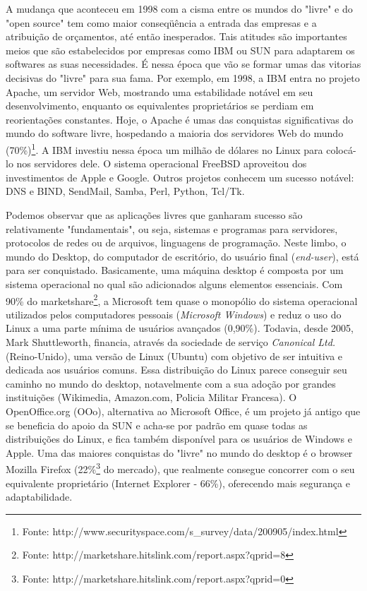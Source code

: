 A mudança que aconteceu em 1998 com a cisma entre os mundos do "livre" e do "open source" tem como maior conseqüência a entrada das empresas e a atribuição de orçamentos, até então inesperados. Tais atitudes são importantes meios que são estabelecidos por empresas como IBM ou SUN para adaptarem os softwares as suas necessidades. É nessa época que vão se formar umas das vitorias decisivas do "livre" para sua fama. Por exemplo, em 1998, a IBM entra no projeto Apache, um servidor Web, mostrando uma estabilidade notável em seu desenvolvimento, enquanto os equivalentes proprietários se perdiam em reorientações constantes. Hoje, o Apache é umas das conquistas significativas do mundo do software livre, hospedando a maioria dos servidores Web do mundo (70\%)\footnote{Fonte: http://www.securityspace.com/s\_survey/data/200905/index.html}. A IBM investiu nessa época um milhão de dólares no Linux para colocá-lo nos servidores dele. O sistema operacional FreeBSD aproveitou dos investimentos de Apple e Google. Outros projetos conhecem um sucesso notável: DNS e BIND, SendMail, Samba, Perl, Python, Tcl/Tk.

Podemos observar que as aplicações livres que ganharam sucesso são relativamente "fundamentais", ou seja, sistemas e programas para servidores, protocolos de redes ou de arquivos, linguagens de programação. Neste limbo, o mundo do Desktop, do computador de escritório, do usuário final (\emph{end-user}), está para ser conquistado. Basicamente, uma máquina desktop é composta por um sistema operacional no qual são adicionados alguns elementos essenciais. Com 90\% do marketshare\footnote{Fonte: http://marketshare.hitslink.com/report.aspx?qprid=8}, a Microsoft tem quase o monopólio do sistema operacional utilizados pelos computadores pessoais (\emph{Microsoft Windows}) e reduz o uso do Linux a uma parte mínima de usuários avançados (0,90\%).  Todavia, desde 2005, Mark Shuttleworth, financia, através da sociedade de serviço \emph{Canonical Ltd.} (Reino-Unido), uma versão de Linux (Ubuntu) com objetivo de ser intuitiva e dedicada aos usuários comuns. Essa distribuição do Linux parece conseguir seu caminho no mundo do desktop, notavelmente com a sua adoção por grandes instituições (Wikimedia, Amazon.com, Policia Militar Francesa). O OpenOffice.org (OOo), alternativa ao Microsoft Office, é um projeto já antigo que se beneficia do apoio da SUN e acha-se por padrão em quase todas as distribuições do Linux, e fica também disponível para os usuários de Windows e Apple. Uma das maiores conquistas do "livre" no mundo do desktop é o browser Mozilla Firefox (22\%\footnote{Fonte: http://marketshare.hitslink.com/report.aspx?qprid=0} do mercado), que realmente consegue concorrer com o seu equivalente proprietário (Internet Explorer - 66\%), oferecendo mais segurança e adaptabilidade.

